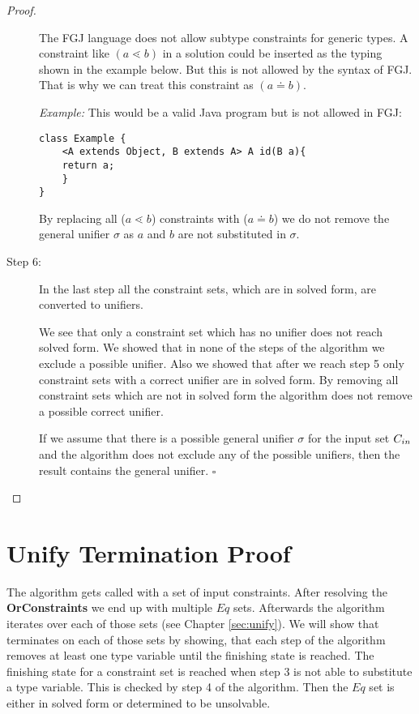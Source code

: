 \begin{proof}
\begin{description}
The FGJ language does not allow subtype constraints for generic types.
A constraint like $(a \lessdot b)$ in a solution could be inserted as the typing shown in the example below.
But this is not allowed by the syntax of FGJ.
That is why we can treat this constraint as $(a \doteq b)$.


\textit{Example:}
This would be a valid Java program but is not allowed in FGJ:
\begin{lstlisting}
class Example {
    <A extends Object, B extends A> A id(B a){
    return a;
    }
}
\end{lstlisting}

By replacing all ($a \lessdot b$) constraints with ($a \doteq b$) we
    do not remove the general unifier $\sigma$ as $a$ and $b$ are not substituted
    in $\sigma$. 

\item[Step 6:]
In the last step all the constraint sets, which are in solved form, are converted to unifiers.

We see that only a constraint set which has no unifier does not reach solved form.
We showed that in none of the steps of the \unify{} algorithm we exclude a possible unifier.
Also we showed that after we reach step 5 only constraint sets with a correct unifier are in solved form.
By removing all constraint sets which are not in solved form the algorithm does not
remove a possible correct unifier.

If we assume that there is a possible general unifier $\sigma$ for the input set $C_{in}$
and the \unify{} algorithm does not exclude any of the possible unifiers,
then the result \unify{} contains the general unifier.
\hfill $\square$
\end{description}
\end{proof}

\section{Unify Termination Proof}\label{chapter:unifyTerminationProof}

The \unify{} algorithm gets called with a set of input constraints.
After resolving the \textbf{OrConstraints} we end up with multiple $Eq$ sets.
Afterwards the algorithm iterates over each of those sets (see Chapter \ref{sec:unify}).
We will show that \unify{} terminates on each of those sets by showing,
that each step of the algorithm removes at least one type variable
until the finishing state is reached.
The finishing state for a constraint set is reached when step 3 is not able to substitute a type variable.
This is checked by step 4 of the algorithm.
Then the $Eq$ set is either in solved form or determined to be unsolvable.

